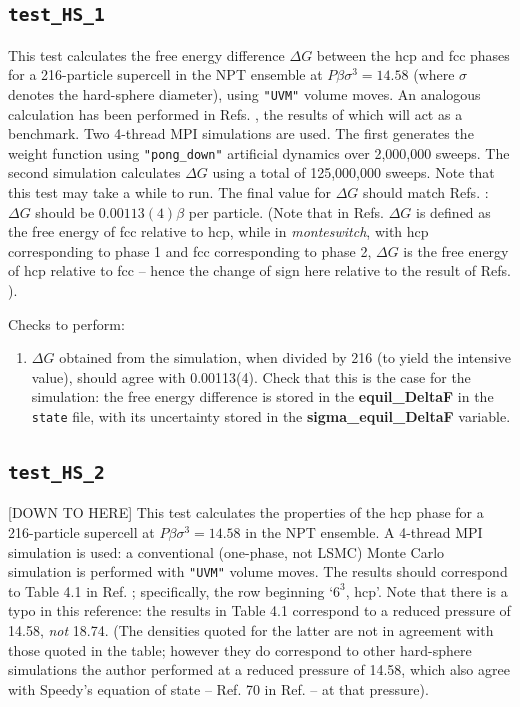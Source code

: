 \documentclass{report}
\begin{document}
\subsection{\texttt{test\_HS\_1}}
This test calculates the free energy difference $\Delta G$ between the hcp and fcc phases for a 216-particle supercell in the NPT ensemble at
$P\beta\sigma^3=14.58$ (where $\sigma$ denotes the hard-sphere diameter), using \texttt{"UVM"} volume moves. An analogous calculation
has been performed in Refs. \cite{thesis:Jackson,Bruce_2000}, the results of which will act as a benchmark.
Two 4-thread MPI simulations are used. The first generates the weight function using \texttt{"pong\_down"}
artificial dynamics over 2,000,000 sweeps. The second simulation calculates $\Delta G$ using a total of 125,000,000 sweeps. 
Note that this test may take a while to run. The final value for $\Delta G$ should match Refs. \cite{thesis:Jackson,Bruce_2000}: 
$\Delta G$ should be $0.00113(4)\beta$ per particle. (Note that in Refs. \cite{thesis:Jackson,Bruce_2000} $\Delta G$ is defined as
the free energy of fcc relative to hcp, while in \emph{monteswitch}, with hcp corresponding to phase 1 and fcc corresponding to phase 2, 
$\Delta G$ is the free energy of hcp relative to fcc -- hence the change of sign here relative to the result of Refs. 
\cite{thesis:Jackson,Bruce_2000}).

Checks to perform:
\begin{enumerate}
\item
$\Delta G$ obtained from the simulation, when divided by 216 (to yield the intensive value), should agree with 0.00113(4).
Check that this is the case for the simulation: the free energy difference is stored in the \textbf{equil\_DeltaF}
in the \texttt{state} file, with its uncertainty stored in the \textbf{sigma\_equil\_DeltaF} variable.
\end{enumerate}


\subsection{\texttt{test\_HS\_2}}
[DOWN TO HERE]
This test calculates the properties of the hcp phase for a 216-particle supercell at $P\beta\sigma^3=14.58$ in
the NPT ensemble. A 4-thread MPI simulation is used: a conventional (one-phase, not LSMC) Monte Carlo simulation is
performed with \texttt{"UVM"} volume moves. The
results should correspond to Table 4.1 in Ref. \cite{thesis:Jackson}; specifically, the row beginning `$6^3$, hcp'. Note
that there is a typo in this reference: the results in Table 4.1 correspond to a reduced pressure of 14.58, \emph{not}
18.74. (The densities quoted for the latter are not in agreement with those quoted in the table; however they
do correspond to other hard-sphere simulations the author performed at a reduced pressure of 14.58, which also agree with
Speedy's equation of state -- Ref. 70 in Ref. \cite{thesis:Jackson} -- at that pressure).
\end{document}
